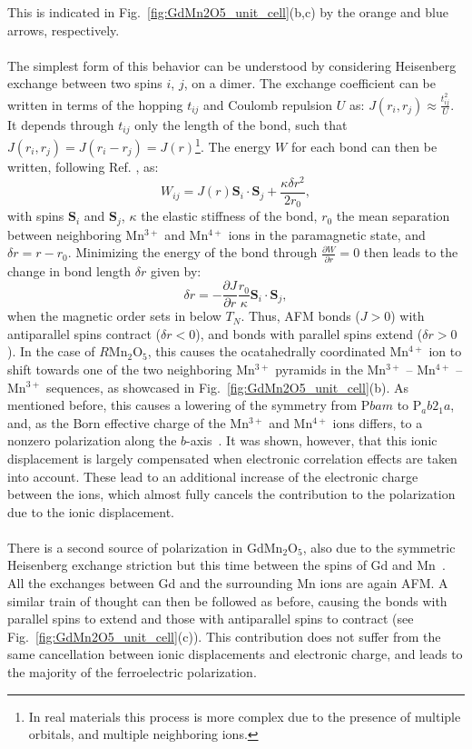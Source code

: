 This is indicated in Fig.~\ref{fig:GdMn2O5_unit_cell}(b,c) by the orange and blue arrows, respectively.
\\\\
The simplest form of this behavior can be understood by considering Heisenberg exchange between two spins $i$, $j$, on a dimer.
The exchange coefficient can be written in terms of the hopping $t_{ij}$ and Coulomb repulsion $U$ as: $J(r_i, r_j)\approx \frac{t_{ij}^2}{U}$.
It depends through $t_{ij}$ only the length of the bond, such that $J(r_i, r_j) = J(r_i - r_j) = J(r)$\footnote{In real materials this process is more complex due to the presence of multiple orbitals, and multiple neighboring ions.}.
The energy $W$ for each bond can then be written, following Ref. \cite{Harris1972}, as:
\begin{equation}
	W_{ij} = J(r)\bm{S}_i \cdot \bm{S}_j + \frac{\kappa \delta r^2}{2r_0},
\end{equation}
with spins $\bm{S}_i$ and $\bm{S}_j$, $\kappa$ the elastic stiffness of the bond, $r_0$ the mean separation between neighboring Mn$^{3+}$ and Mn$^{4+}$ ions in the paramagnetic state, and $\delta r = r - r_0$.
Minimizing the energy of the bond through $\frac{\partial W}{\partial r} = 0$ then leads to the change in bond length $\delta r$ given by:
\begin{equation}
	\delta r = -\frac{\partial J}{\partial r}\frac{r_0}{\kappa}\bm{S}_i \cdot \bm{S}_j,
\end{equation}
when the magnetic order sets in below $T_N$. Thus, AFM bonds ($J > 0$) with antiparallel spins contract ($\delta r < 0$), and bonds with parallel spins extend ($\delta r > 0$).
In the case of $R$Mn$_2$O$_5$, this causes the ocatahedrally coordinated Mn$^{4+}$ ion to shift towards one of the two neighboring Mn$^{3+}$ pyramids in the Mn$^{3+}$ -- Mn$^{4+}$ -- Mn$^{3+}$ sequences, as showcased in Fig.~\ref{fig:GdMn2O5_unit_cell}(b).
As mentioned before, this causes a lowering of the symmetry from P$bam$ to P$_ab2_1a$, and, as the Born effective charge of the Mn$^{3+}$ and Mn$^{4+}$ ions differs, to a nonzero polarization along the $b$-axis~\cite{Khomskii2009}.
It was shown, however, that this ionic displacement is largely compensated when electronic correlation effects are taken into account.
These lead to an additional increase of the electronic charge between the ions, which almost fully cancels the contribution to the polarization due to the ionic displacement.
\\\\
There is a second source of polarization in GdMn$_2$O$_5$, also due to the symmetric Heisenberg exchange striction but this time between the spins of Gd and Mn~\cite{Lee13}.
All the exchanges between Gd and the surrounding Mn ions are again AFM.
A similar train of thought can then be followed as before, causing the bonds with parallel spins to extend and those with antiparallel spins to contract (see Fig.~\ref{fig:GdMn2O5_unit_cell}(c)).
This contribution does not suffer from the same cancellation between ionic displacements and electronic charge, and leads to the majority of the ferroelectric polarization.

